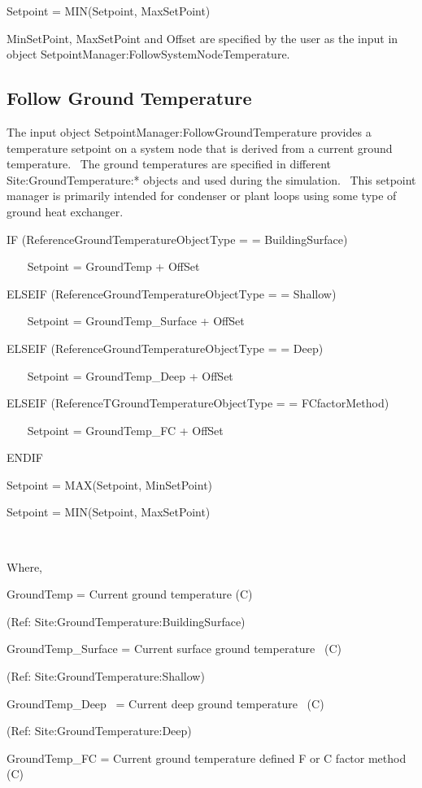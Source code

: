 Setpoint = MIN(Setpoint, MaxSetPoint)

MinSetPoint, MaxSetPoint and Offset are specified by the user as the input in object SetpointManager:FollowSystemNodeTemperature.

\subsection{Follow Ground Temperature}\label{follow-ground-temperature}

The input object SetpointManager:FollowGroundTemperature provides a temperature setpoint on a system node that is derived from a current ground temperature.~ The ground temperatures are specified in different Site:GroundTemperature:* objects and used during the simulation.~ This setpoint manager is primarily intended for condenser or plant loops using some type of ground heat exchanger.

IF (ReferenceGroundTemperatureObjectType = = BuildingSurface)

~~~ Setpoint = GroundTemp + OffSet

ELSEIF (ReferenceGroundTemperatureObjectType = = Shallow)

~~~ Setpoint = GroundTemp\_Surface + OffSet

ELSEIF (ReferenceGroundTemperatureObjectType = = Deep)

~~~ Setpoint = GroundTemp\_Deep + OffSet

ELSEIF (ReferenceTGroundTemperatureObjectType = = FCfactorMethod)

~~~ Setpoint = GroundTemp\_FC + OffSet

ENDIF

Setpoint = MAX(Setpoint, MinSetPoint)

Setpoint = MIN(Setpoint, MaxSetPoint)

\emph{~}

Where,

GroundTemp = Current ground temperature (C)

(Ref: Site:GroundTemperature:BuildingSurface)

GroundTemp\_Surface = Current surface ground temperature~ (C)

(Ref: Site:GroundTemperature:Shallow)

GroundTemp\_Deep~ = Current deep ground temperature~ (C)

(Ref: Site:GroundTemperature:Deep)

GroundTemp\_FC = Current ground temperature defined F or C factor method (C)

